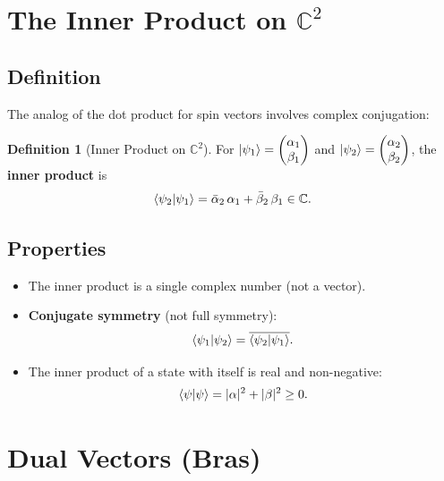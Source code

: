 \documentclass[11pt,a4paper]{article}
\theoremstyle{definition}
\newtheorem{definition}{Definition}[section]
\theoremstyle{plain}
\theoremstyle{remark}
\begin{document}
\section{The Inner Product on $\mathbb{C}^2$}

\subsection{Definition}

The analog of the dot product for spin vectors involves complex conjugation:

\begin{definition}[Inner Product on $\mathbb{C}^2$]
    For $\ket{\psi_1} = \begin{pmatrix} \alpha_1 \\ \beta_1 \end{pmatrix}$ and $\ket{\psi_2} = \begin{pmatrix} \alpha_2 \\ \beta_2 \end{pmatrix}$, the \textbf{inner product} is
    \[
        \braket{\psi_2}{\psi_1} = \bar{\alpha}_2\,\alpha_1 + \bar{\beta}_2\,\beta_1 \in \mathbb{C}.
    \]
\end{definition}

\subsection{Properties}

\begin{itemize}
    \item The inner product is a single complex number (not a vector).
    \item \textbf{Conjugate symmetry} (not full symmetry):
    \[
        \braket{\psi_1}{\psi_2} = \overline{\braket{\psi_2}{\psi_1}}.
    \]
    \item The inner product of a state with itself is real and non-negative:
    \[
        \braket{\psi}{\psi} = |\alpha|^2 + |\beta|^2 \geq 0.
    \]
\end{itemize}

\section{Dual Vectors (Bras)}
\end{document}
